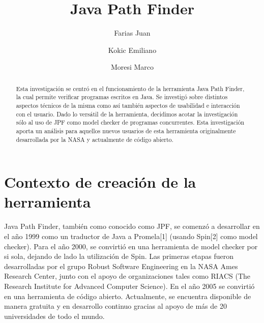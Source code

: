 \documentclass[runningheads]{llncs}
\begin{document}
%
\title{\textbf{Java Path Finder}
}
%

\author{Farias Juan\and
Kokic Emiliano \and
Moresi Marco}
%
%
%

\maketitle              %
%
\begin{abstract}
Esta investigaci\'on se centr\'o en el funcionamiento de la herramienta Java Path Finder, la cual permite verificar programas escritos en Java. Se investig\'o sobre distintos aspectos t\'ecnicos de la misma como as\'i tambi\'en aspectos de usabilidad e interacci\'on con el usuario.
Dado lo vers\'atil de la herramienta, decidimos acotar la investigaci\'on s\'olo al uso de JPF como model checker de programas concurrentes. Esta investigaci\'on aporta un an\'alisis para aquellos nuevos usuarios de esta herramienta originalmente desarrollada por la NASA y actualmente de c\'odigo abierto.


\end{abstract}
%
%
%
\section{Contexto de creaci\'on de la herramienta}

Java Path Finder, tambi\'en como conocido como JPF,  se comenz\'o a desarrollar en el a\~no  1999 como un traductor de Java a Promela[1] (usando Spin[2] como model checker). Para el a\~no 2000, se convirti\'o en una herramienta de model checker por si sola, dejando de lado la utilizaci\'on de Spin. Las primeras etapas fueron desarrolladas por el grupo Robust Software Engineering en la NASA Ames Research Center, junto con el apoyo de organizaciones tales como RIACS (The Research Institute for Advanced Computer Science).
En el a\~no 2005 se convirti\'o en una herramienta de c\'odigo abierto. Actualmente, se encuentra disponible de manera gratuita y en desarrollo continuo gracias al apoyo de m\'as de 20 universidades de todo el mundo.
\end{document}
